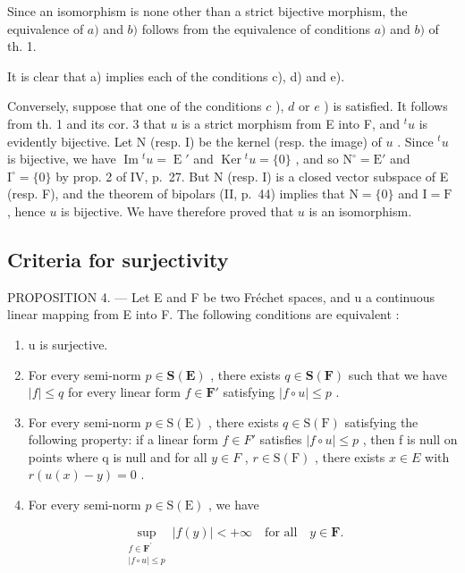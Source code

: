 Since an isomorphism is none other than a strict bijective morphism, the equivalence of \(a)\) and \(b)\) follows from the equivalence of conditions \(a)\) and \(b)\) of th. 1.

It is clear that a) implies each of the conditions c), d) and e).

Conversely, suppose that one of the conditions \(c\) ), \(d\) or \(e\) ) is satisfied. It follows from th. 1 and its cor. 3 that \(u\) is a strict morphism from E into F, and \({}^t u\) is evidently bijective. Let N (resp. I) be the kernel (resp. the image) of \(u\) . Since \({}^t u\) is bijective, we have \(\operatorname{Im} {}^t u = \operatorname{E}'\) and \(\operatorname{Ker} {}^t u = \{0\}\) , and so \(\mathrm{N}^\circ = \mathrm{E}'\) and \(\mathrm{I}^\circ = \{0\}\) by prop. 2 of IV, p.~27. But N (resp. I) is a closed vector subspace of E (resp. F), and the theorem of bipolars (II, p.~44) implies that \(\mathrm{N} = \{0\}\) and \(\mathrm{I} = \mathrm{F}\) , hence \(u\) is bijective. We have therefore proved that \(u\) is an isomorphism.

\subsection{Criteria for surjectivity}

PROPOSITION 4. --- Let E and F be two Fréchet spaces, and u a continuous linear mapping from E into F. The following conditions are equivalent :

\begin{enumerate}
\def\labelenumi{(\roman{enumi})}
\item
  u is surjective.
\item
  For every semi-norm \(p \in \mathbf{S}(\mathbf{E})\) , there exists \(q \in \mathbf{S}(\mathbf{F})\) such that we have \(|f| \leqslant q\) for every linear form \(f \in \mathbf{F}'\) satisfying \(|f \circ u| \leqslant p\) .
\item
  For every semi-norm \(p \in \mathrm{S}(\mathrm{E})\) , there exists \(q \in \mathrm{S}(\mathrm{F})\) satisfying the following property: if a linear form \(f \in F'\) satisfies \(|f \circ u| \leqslant p\) , then f is null on points where q is null and for all \(y \in F\) , \(r \in \mathrm{S}(\mathrm{F})\) , there exists \(x \in E\) with \(r(u(x) - y) = 0\) .
\item
  For every semi-norm \(p \in \mathrm{S}(\mathrm{E})\) , we have
\end{enumerate}

\[
\sup_{\substack{f\in \mathbf{F}^{\prime}\\ |f\circ u|\leqslant p}}\big|f(y)\big| <   + \infty \quad \text{for all} \quad y\in \mathbf{F}  .\tag{1}
\]

